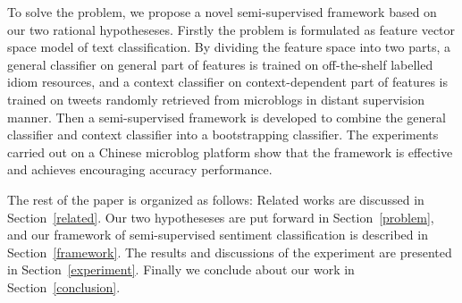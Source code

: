 \documentclass{llncs}
\begin{document}
To solve the problem, we propose a novel semi-supervised framework based on our two rational hypotheseses.
Firstly the problem is formulated as feature vector space model of text classification. 
By dividing the feature space into two parts, a general classifier on general part of features is trained on off-the-shelf labelled idiom resources, and a context classifier on context-dependent part of features is trained on tweets randomly retrieved from microblogs in distant supervision manner. 
Then a semi-supervised framework is developed to combine the general classifier and context classifier into a bootstrapping classifier. 
The experiments carried out on a Chinese microblog platform show that the framework is  effective and achieves encouraging accuracy performance.

The rest of the paper is organized as follows: Related works are discussed in Section~\ref{related}. Our two hypotheseses are put forward in
Section~\ref{problem}, and our framework of semi-supervised sentiment classification is described in Section~\ref{framework}. The results and discussions of the experiment are presented in Section~\ref{experiment}. Finally we conclude about our work in Section~\ref{conclusion}.
\end{document}

